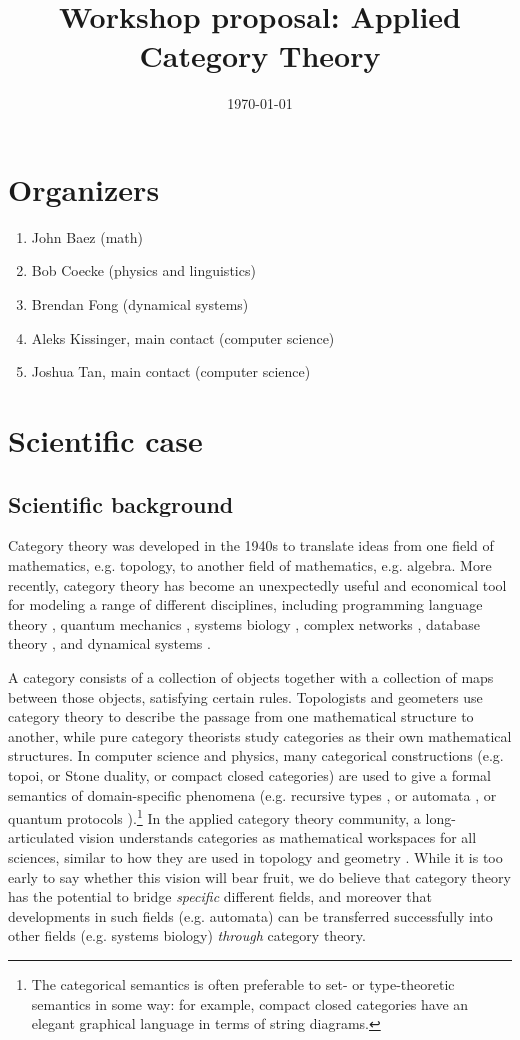 \documentclass{article}
\title{Workshop proposal: Applied Category Theory}
\date{\today}
\begin{document}
\maketitle

\section{Organizers}
\begin{enumerate}
\item John Baez (math)
\item Bob Coecke (physics and linguistics) 
\item Brendan Fong (dynamical systems)
\item Aleks Kissinger, main contact (computer science)
\item Joshua Tan, main contact (computer science)
\end{enumerate}

\section{Scientific case}
\subsection{Scientific background}
Category theory was developed in the 1940s to translate ideas from one field of mathematics, e.g. topology, to another field of mathematics, e.g. algebra. More recently, category theory has become an unexpectedly useful and economical tool for modeling a range of different disciplines, including programming language theory \cite{abramsky}, quantum mechanics \cite{coecke}, systems biology \cite{cardelli}, complex networks \cite{baez}, database theory \cite{rosebrugh}, and dynamical systems \cite{spivak}.

A category consists of a collection of objects together with a collection of maps between those objects, satisfying certain rules. Topologists and geometers use category theory to describe the passage from one mathematical structure to another, while pure category theorists study categories as their own mathematical structures. In computer science and physics, many categorical constructions (e.g. topoi, or Stone duality, or compact closed categories) are used to give a formal semantics of domain-specific phenomena (e.g. recursive types \cite{simpson}, or automata \cite{pippenger}, or quantum protocols \cite{abramsky_coecke}).\footnote{The categorical semantics is often preferable to set- or type-theoretic semantics in some way: for example, compact closed categories have an elegant graphical language in terms of string diagrams.} In the applied category theory community, a long-articulated vision understands categories as mathematical workspaces for all sciences, similar to how they are used in topology and geometry \cite{spivak_book, earlier_citation?}. While it is too early to say whether this vision will bear fruit, we do believe that category theory has the potential to bridge \emph{specific} different fields, and moreover that developments in such fields (e.g. automata) can be transferred successfully into other fields (e.g. systems biology) \emph{through} category theory.
\end{document}
